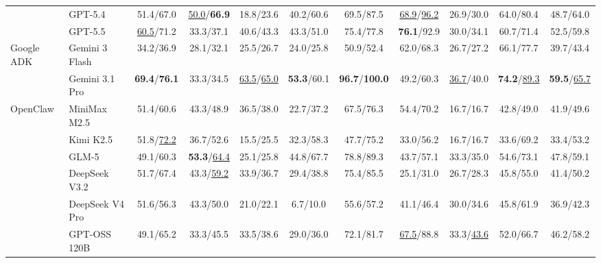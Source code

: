 {\begin{tabular}{@{}ll ccccc ccc c@{}}
 & GPT-5.4 & 51.4/67.0 & \underline{50.0}/\textbf{66.9} & 18.8/23.6 & 40.2/60.6 & 69.5/87.5 & \underline{68.9}/\underline{96.2} & 26.9/30.0 & 64.0/80.4 & 48.7/64.0 \\
 & GPT-5.5 & \underline{60.5}/71.2 & 33.3/37.1 & 40.6/43.3 & 43.3/51.0 & 75.4/77.8 & \textbf{76.1}/92.9 & 30.0/34.1 & 60.7/71.4 & 52.5/59.8 \\
\midrule
\multirow{2}{*}{Google ADK} & Gemini 3 Flash & 34.2/36.9 & 28.1/32.1 & 25.5/26.7 & 24.0/25.8 & 50.9/52.4 & 62.0/68.3 & 26.7/27.2 & 66.1/77.7 & 39.7/43.4 \\
 & Gemini 3.1 Pro & \textbf{69.4}/\textbf{76.1} & 33.3/34.5 & \underline{63.5}/\underline{65.0} & \textbf{53.3}/60.1 & \textbf{96.7}/\textbf{100.0} & 49.2/60.3 & \underline{36.7}/40.0 & \textbf{74.2}/\underline{89.3} & \textbf{59.5}/\underline{65.7} \\
\midrule
\multirow{6}{*}{OpenClaw} & MiniMax M2.5 & 51.4/60.6 & 43.3/48.9 & 36.5/38.0 & 22.7/37.2 & 67.5/76.3 & 54.4/70.2 & 16.7/16.7 & 42.8/49.0 & 41.9/49.6 \\
 & Kimi K2.5 & 51.8/\underline{72.2} & 36.7/52.6 & 15.5/25.5 & 32.3/58.3 & 47.7/75.2 & 33.0/56.2 & 16.7/16.7 & 33.6/69.2 & 33.4/53.2 \\
 & GLM-5 & 49.1/60.3 & \textbf{53.3}/\underline{64.4} & 25.1/25.8 & 44.8/67.7 & 78.8/89.3 & 43.7/57.1 & 33.3/35.0 & 54.6/73.1 & 47.8/59.1 \\
 & DeepSeek V3.2 & 51.7/67.4 & 43.3/\underline{59.2} & 33.9/36.7 & 29.4/38.8 & 75.4/85.5 & 25.1/31.0 & 26.7/28.3 & 45.8/55.0 & 41.4/50.2 \\
 & DeepSeek V4 Pro & 51.6/56.3 & 43.3/50.0 & 21.0/22.1 & 6.7/10.0 & 55.6/57.2 & 41.1/46.4 & 30.0/34.6 & 45.8/61.9 & 36.9/42.3 \\
 & GPT-OSS 120B & 49.1/65.2 & 33.3/45.5 & 33.5/38.6 & 29.0/36.0 & 72.1/81.7 & \underline{67.5}/88.8 & 33.3/\underline{43.6} & 52.0/66.7 & 46.2/58.2 \\
\bottomrule[2pt]
\end{tabular}%
}

